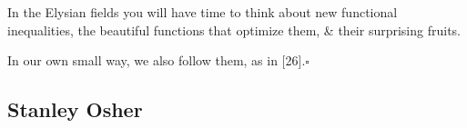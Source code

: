 \documentclass{article}
\begin{document}
In the Elysian fields you will have time to think about new functional inequalities, the beautiful functions that optimize them, \& their surprising fruits.

In our own small way, we also follow them, as in [26].\hfill$\square$



\subsection{Stanley Osher}


\end{document}
